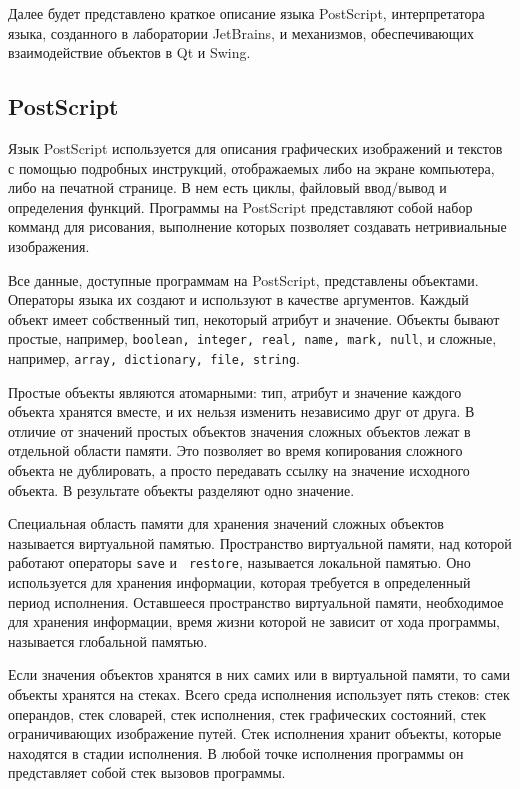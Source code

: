 Далее будет представлено краткое описание языка PostScript, интерпретатора языка, созданного в лаборатории JetBrains, и механизмов, обеспечивающих взаимодействие объектов в Qt и Swing.


\subsection{PostScript}

Язык PostScript используется для описания графических изображений и текстов с помощью подробных инструкций, отображаемых либо на экране компьютера, либо на печатной странице. В нем есть циклы, файловый ввод/вывод и определения функций. Программы на PostScript представляют собой набор комманд для рисования, выполнение которых позволяет создавать нетривиальные изображения.

Все данные, доступные программам на PostScript, представлены объектами. Операторы языка их создают и используют в качестве аргументов. Каждый объект имеет собственный тип, некоторый атрибут и значение. 
Объекты бывают простые, например, \texttt{boolean, integer, real, name, mark, null}, и сложные, например, \texttt{array, dictionary, file, string}.    

Простые объекты являются атомарными: тип, атрибут и значение каждого объекта хранятся вместе, и их нельзя изменить независимо друг от друга. В отличие от значений простых объектов значения сложных объектов лежат в отдельной области памяти. Это позволяет во время копирования сложного объекта не дублировать, а просто передавать ссылку на значение исходного объекта. В результате объекты разделяют одно значение.

Специальная область памяти для хранения значений сложных объектов называется виртуальной памятью. Пространство виртуальной памяти, над которой работают операторы \texttt{save} и \texttt{ restore}, называется локальной памятью. Оно используется для хранения информации, которая требуется в определенный период исполнения. Оставшееся пространство виртуальной памяти, необходимое для хранения информации, время жизни которой не зависит от хода программы, называется глобальной памятью.

Если значения объектов хранятся в них самих или в виртуальной памяти, то сами объекты хранятся на стеках. Всего среда исполнения использует пять стеков: стек операндов, стек словарей, стек исполнения, стек графических состояний, стек ограничивающих изображение путей. Стек исполнения хранит объекты, которые находятся в стадии исполнения. В любой точке исполнения программы он представляет собой стек вызовов программы.

